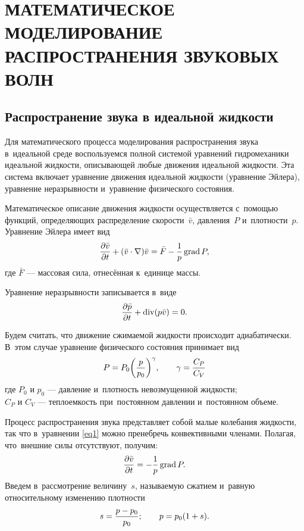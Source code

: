 \section{МАТЕМАТИЧЕСКОЕ МОДЕЛИРОВАНИЕ РАСПРОСТРАНЕНИЯ ЗВУКОВЫХ ВОЛН}

\newpage
\subsection{Распространение звука в идеальной жидкости}

Для математического процесса моделирования распространения звука в~идеальной среде воспользуемся полной системой уравнений гидромеханики идеальной жидкости, описывающей любые движения идеальной жидкости. Эта система включает уравнение движения идеальной жидкости (уравнение Эйлера), уравнение неразрывности и~уравнение физического состояния.

Математическое описание движения жидкости осуществляется с~помощью функций, определяющих распределение скорости~$\bar{v}$, давления~$P$ и~плотности~$p$. Уравнение Эйлера имеет вид
\begin{equation}\label{eq1}
\frac{\partial \bar{v}}{\partial t} + (\bar{v} \cdot \nabla)\bar{v} = \bar F - \frac{1}{p}\operatorname{grad} P,
\end{equation}
где $\bar F$ --- массовая сила, отнесённая к~единице массы.

Уравнение неразрывности записывается в~виде
\begin{equation}\label{eq2}
\frac{\partial \bar{p}}{\partial t} + \operatorname{div} (p \bar{v}) = 0.
\end{equation}

Будем считать, что движение сжимаемой жидкости происходит адиабатически. В~этом случае уравнение физического состояния принимает вид
\begin{equation}\label{eq3}
P=P_0\bigg(\frac{p}{p_0}\bigg)^\gamma, \qquad \gamma=\frac{C_P}{C_V}
\end{equation}
где $P_0$ и $p_0$ --- давление и~плотность невозмущенной жидкости; \\
 $C_P$ и $C_V$ --- теплоемкость при~постоянном давлении и~постоянном объеме.

Процесс распространения звука представляет собой малые колебания жидкости, так что в~уравнении \eqref{eq1} можно пренебречь конвективными членами. Полагая, что~внешние силы отсутствуют, получим:
\begin{equation}\label{eq4}
\frac{\partial \bar{v}}{\partial t} = - \frac{1}{p}\operatorname{grad} P.
\end{equation}
Введем в~рассмотрение величину~$s$, называемую сжатием и~равную относительному изменению плотности
\begin{equation}\label{eq5}
s=\frac{p - p_0}{p_0}; \qquad p = p_0 (1+s).
\end{equation}

